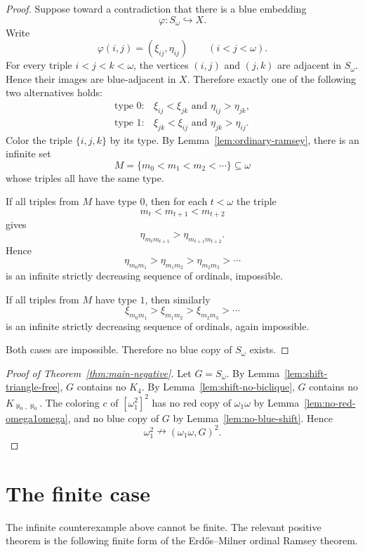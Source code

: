 \documentclass[11pt,a4paper]{amsart}
\theoremstyle{definition}
\begin{document}
\begin{proof}
Suppose toward a contradiction that there is a blue embedding
\[
        \varphi:S_\omega\hookrightarrow X.
\]
Write
\[
        \varphi(i,j)=(\xi_{ij},\eta_{ij})
        \qquad(i<j<\omega).
\]
For every triple $i<j<k<\omega$, the vertices $(i,j)$ and $(j,k)$ are adjacent in $S_\omega$.  Hence their images are blue-adjacent in $X$.  Therefore exactly one of the following two alternatives holds:
\[
\begin{array}{ll}
        \text{type }0: & \xi_{ij}<\xi_{jk}\text{ and }\eta_{ij}>\eta_{jk},\\[2mm]
        \text{type }1: & \xi_{jk}<\xi_{ij}\text{ and }\eta_{jk}>\eta_{ij}.
\end{array}
\]
Color the triple $\{i,j,k\}$ by its type.  By Lemma~\ref{lem:ordinary-ramsey}, there is an infinite set
\[
        M=\{m_0<m_1<m_2<\cdots\}\subseteq\omega
\]
whose triples all have the same type.

If all triples from $M$ have type $0$, then for each $t<\omega$ the triple
\[
        m_t<m_{t+1}<m_{t+2}
\]
gives
\[
        \eta_{m_t m_{t+1}}>\eta_{m_{t+1}m_{t+2}}.
\]
Hence
\[
        \eta_{m_0m_1}>\eta_{m_1m_2}>\eta_{m_2m_3}>\cdots
\]
is an infinite strictly decreasing sequence of ordinals, impossible.

If all triples from $M$ have type $1$, then similarly
\[
        \xi_{m_0m_1}>\xi_{m_1m_2}>\xi_{m_2m_3}>\cdots
\]
is an infinite strictly decreasing sequence of ordinals, again impossible.

Both cases are impossible.  Therefore no blue copy of $S_\omega$ exists.
\end{proof}

\begin{proof}[Proof of Theorem~\ref{thm:main-negative}]
Let $G=S_\omega$.  By Lemma~\ref{lem:shift-triangle-free}, $G$ contains no $K_4$.  By Lemma~\ref{lem:shift-no-biclique}, $G$ contains no $K_{\aleph_0,\aleph_0}$.  The coloring $c$ of $[\omega_1^2]^2$ has no red copy of $\omega_1\omega$ by Lemma~\ref{lem:no-red-omega1omega}, and no blue copy of $G$ by Lemma~\ref{lem:no-blue-shift}.  Hence
\[
        \omega_1^2\nrightarrow(\omega_1\omega,G)^2.
\]
\end{proof}

\section{The finite case}\label{sec:finite-case}

The infinite counterexample above cannot be finite.  The relevant positive theorem is the following finite form of the Erd\H{o}s--Milner ordinal Ramsey theorem.
\end{document}
